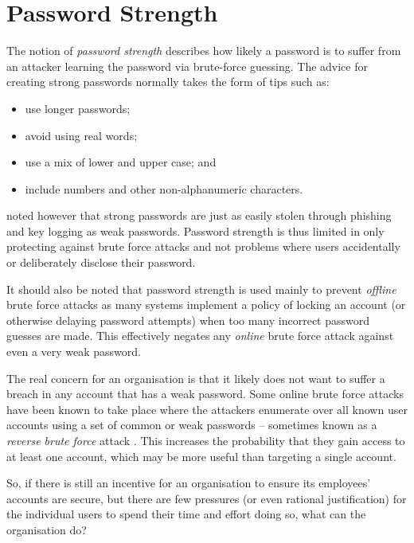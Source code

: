 \documentclass{report}
\begin{document}
\section{Password Strength}
\label{sec:strength}

The notion of \emph{password strength} describes how likely
a password is to suffer from an attacker learning the password via brute-force
guessing. The advice for creating strong passwords normally takes the form of tips
such as:

\begin{itemize}
  \item use longer passwords;
  \item avoid using real words;
  \item use a mix of lower and upper case; and
  \item include numbers and other non-alphanumeric characters.
\end{itemize}

\textcite{florencio2007large} noted however that strong passwords are just
as easily stolen through phishing and key logging as weak
passwords. Password strength is thus limited in only protecting against
brute force attacks and not problems where users accidentally
or deliberately disclose their password.

It should also be noted that password strength is
used mainly to prevent
\emph{offline} brute force attacks as many systems
implement a policy of locking an account (or otherwise
delaying password attempts) when too many incorrect
password guesses are made. This effectively negates any
\emph{online} brute force attack against even a very weak
password.

The real concern for an organisation
is that it likely does not want to suffer
a breach in any account that has a weak password. Some
online brute force attacks have been known to take place
where the attackers enumerate over all known user accounts
using a set of common or weak passwords -- sometimes known
as a \emph{reverse brute force} attack \parencite{khan2010comparative}.
This increases
the probability that they gain access to at least one
account, which may be more useful than targeting a single
account.

So, if there is still an incentive for an organisation
to ensure its employees' accounts are secure, but there
are few pressures (or even rational justification)
for the individual users to spend their time and effort doing
so, what can the organisation do?
\end{document}
